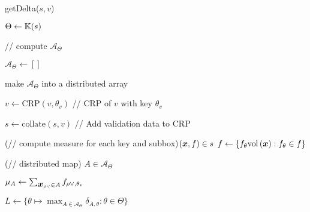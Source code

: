 \documentclass[../mde.tex]{subfiles}
\begin{document}
  \begin{algorithm}
    \caption{getDelta($s, v$)}
    \label{alg:get-delta}
    $\Theta \gets \mathbb{K}(s)$

    // compute $\mathcal{A}_\Theta$

    $\mathcal A_\Theta \gets []$


    make $\mathcal A_\Theta$ into a distributed array

    $v \gets \mathrm{CRP}(v, \theta_v)$
    // CRP of $v$ with key $\theta_v$

    $s \gets \mathrm{collate}(s, v)$
    // Add validation data to CRP

    \For(// compute measure for each key and subbox){$(\x, f) \in s$}{
      $f \gets 
        \{ f_\theta \vol(\x) : f_\theta \in f \}$
    }

    \For(// distributed map){
      $A \in \mathcal A_\Theta$
    }{
      $\mu_A \gets \sum_{\x_{\rho\vee} \in A} f_{\rho\vee, \theta_v}$

    }

    $L \gets \{
      \theta \mapsto \max_{A \in \mathcal A_\Theta} \delta_{A, \theta} :
        \theta \in \Theta
    \}$

  \end{algorithm}
\end{document}
